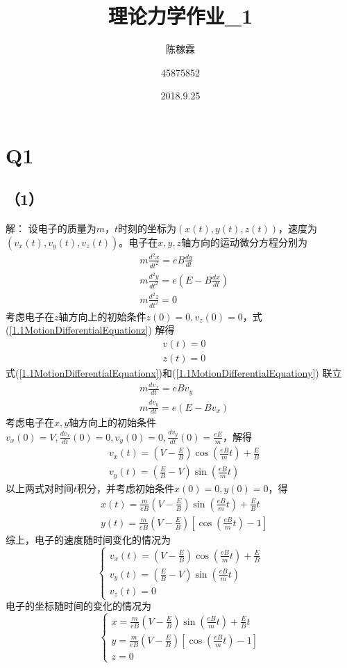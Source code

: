 \documentclass[10pt,a4paper]{article}
\title{理论力学作业\_1}
\author{陈稼霖 \and 45875852}
\date{2018.9.25}
\theoremstyle{remark}
\begin{document}
\maketitle
\section*{Q1}
\subsection*{（1）}解：
设电子的质量为$m$，$t$时刻的坐标为$(x(t),y(t),z(t))$，速度为$(v_x(t),v_y(t),v_z(t))$。电子在$x,y,z$轴方向的运动微分方程分别为
\begin{align}
&m\frac{d^2x}{{dt}^2} = eB\frac{dy}{dt}\label{1.1MotionDifferentialEquationx}\\
&m\frac{d^2y}{{dt}^2} = e(E - B\frac{dx}{dt})\label{1.1MotionDifferentialEquationy}\\
&m\frac{d^2z}{{dt}^2} = 0\label{1.1MotionDifferentialEquationz}
\end{align}
考虑电子在$z$轴方向上的初始条件$z(0) = 0,v_z(0) = 0$，式(\ref{1.1MotionDifferentialEquationz}) 解得
\begin{align*}
&v(t) = 0\\
&z(t) = 0
\end{align*}
式(\ref{1.1MotionDifferentialEquationx})和(\ref{1.1MotionDifferentialEquationy}) 联立
\begin{align*}
&m\frac{dv_x}{dt} = eBv_y\\
&m\frac{dv_y}{dt} = e(E - Bv_x)
\end{align*}
考虑电子在$x,y$轴方向上的初始条件$v_x(0) = V,\frac{dv_x}{dt}(0) = 0,v_y(0) = 0,\frac{dv_y}{dt}(0) = \frac{eE}{m}$，解得
\begin{align*}
&v_x(t) = (V - \frac{E}{B})\cos(\frac{eB}{m}t) + \frac{E}{B}\\
&v_y(t) = (\frac{E}{B} - V)\sin(\frac{eB}{m}t)
\end{align*}
以上两式对时间$t$积分，并考虑初始条件$x(0) = 0,y(0) = 0$，得
\begin{align*}
&x(t) = \frac{m}{eB}(V - \frac{E}{B})\sin(\frac{eB}{m}t) + \frac{E}{B}t\\
&y(t) = \frac{m}{eB}(V - \frac{E}{B})[\cos(\frac{eB}{m}t) - 1]
\end{align*}
综上，电子的速度随时间变化的情况为
\[
\left\{\begin{array}{l}
v_x(t) = (V - \frac{E}{B})\cos(\frac{eB}{m}t) + \frac{E}{B}\\
v_y(t) = (\frac{E}{B} - V)\sin(\frac{eB}{m}t)\\
v_z(t) = 0
\end{array}\right.
\]
电子的坐标随时间的变化的情况为
\[
\left\{\begin{array}{l}
x = \frac{m}{eB}(V - \frac{E}{B})\sin(\frac{eB}{m}t) + \frac{E}{B}t\\
y = \frac{m}{eB}(V - \frac{E}{B})[\cos(\frac{eB}{m}t) - 1]\\
z = 0
\end{array}\right.
\]
\end{document}
